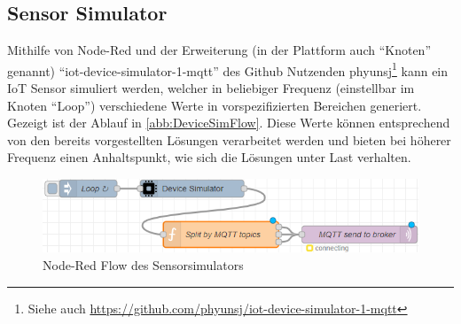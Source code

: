 \subsection{Sensor Simulator}\label{chap:iotdevicesim}
Mithilfe von Node-Red und der Erweiterung (in der Plattform auch \enquote{Knoten} genannt) \enquote{iot-device-simulator-1-mqtt} des Github Nutzenden phyunsj\footnote{Siehe auch \url{https://github.com/phyunsj/iot-device-simulator-1-mqtt}} kann ein \ac{IoT} Sensor simuliert werden, welcher in beliebiger Frequenz (einstellbar im Knoten \enquote{Loop}) verschiedene Werte in vorspezifizierten Bereichen generiert. Gezeigt ist der Ablauf in \autoref{abb:DeviceSimFlow}. Diese Werte können entsprechend von den bereits vorgestellten Lösungen verarbeitet werden und bieten bei höherer Frequenz einen Anhaltspunkt, wie sich die Lösungen unter Last verhalten.
\begin{figure}[H]
\centering
\includegraphics[width=\textwidth]{graphics/Device-Simulator-Flow.png}
\caption{Node-Red Flow des Sensorsimulators}
\label{abb:DeviceSimFlow}
\end{figure}


